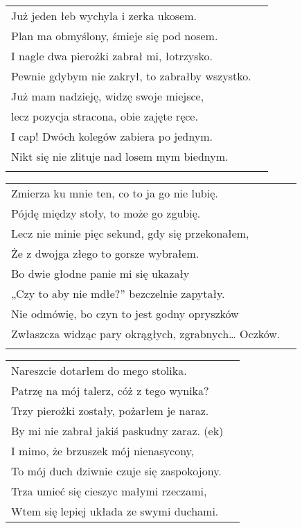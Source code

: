\documentclass[a5paper]{article}
\begin{document}
\noindent
\begin{tabular}{@{}p{9.50cm}p{3cm}@{}}
Już jeden łeb wychyla i zerka ukosem.\\
Plan ma obmyślony, śmieje się pod nosem.\\
I nagle dwa pierożki zabrał mi, łotrzysko.\\
Pewnie gdybym nie zakrył, to zabrałby wszystko.\\
Już mam nadzieję, widzę swoje miejsce,\\
lecz pozycja stracona, obie zajęte ręce.\\
I cap! Dwóch kolegów zabiera po jednym.\\
Nikt się nie zlituje nad losem mym biednym.\\\\
\end{tabular}

\noindent
\begin{tabular}{@{}p{9.50cm}p{3cm}@{}}
Zmierza ku mnie ten, co to ja go nie lubię.\\
Pójdę między stoły, to może go zgubię.\\
Lecz nie minie pięc sekund, gdy się przekonałem,\\
Że z dwojga złego to gorsze wybrałem.\\
Bo dwie głodne panie mi się ukazały\\
„Czy to aby nie mdłe?” bezczelnie zapytały.\\
Nie odmówię, bo czyn to jest godny opryszków\\
Zwłaszcza widząc pary okrągłych, zgrabnych… Oczków.\\ \\
\end{tabular}

\noindent
\begin{tabular}{@{}p{9.50cm}p{3cm}@{}}
Nareszcie dotarłem do mego stolika.\\
Patrzę na mój talerz, cóż z tego wynika?\\
Trzy pierożki zostały, pożarłem je naraz.\\
By mi nie zabrał jakiś paskudny zaraz. (ek)\\
I mimo, że brzuszek mój nienasycony,\\
To mój duch dziwnie czuje się zaspokojony.\\
Trza umieć się cieszyc małymi rzeczami,\\
Wtem się lepiej układa ze swymi duchami.\\
\end{tabular}
\end{document}
